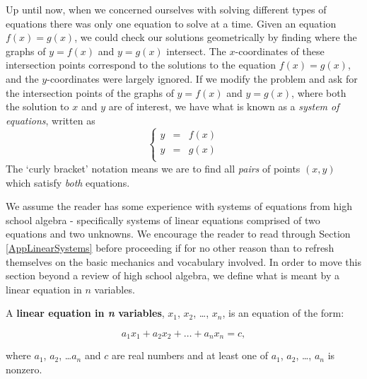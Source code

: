 \documentclass{ximera}
\begin{document}
	\author{Stitz-Zeager}




\setcounter{footnote}{0}

\label{LinSystems}

\setlength{\extrarowheight}{0pt}

Up until now, when we concerned ourselves with solving different types of equations there was only one equation to solve at a time.  Given an equation $f(x) = g(x)$, we could check our solutions geometrically by finding where the graphs of $y=f(x)$ and $y=g(x)$ intersect. The $x$-coordinates of these intersection points correspond to the solutions to the equation $f(x) = g(x)$, and the $y$-coordinates were largely ignored.  If we modify the problem and ask for the intersection points of the graphs of $y=f(x)$ and $y=g(x)$, where both the solution to $x$ and $y$ are of interest, we have what is known as a  \textit{system of equations},  written as \[ \left\{ \begin{array}{rcl} y & = & f(x) \\ y & = & g(x) \\ \end{array} \right.\]  The `curly bracket' notation means we are  to find all \textit{pairs} of points $(x,y)$ which satisfy \textit{both} equations.  

We assume the reader has some experience with systems of equations from high school algebra - specifically systems of linear equations comprised of two equations and two unknowns. We encourage the reader to read through Section \ref{AppLinearSystems} before proceeding if for no other reason than to refresh themselves on the basic mechanics and vocabulary involved.  In order to move this section beyond a review of high school algebra, we  define what is meant by a linear equation in $n$ variables.

 


\begin{definition}  \label{lineareqnnvariables}  A \textbf{linear equation in \textit{n} variables}, $x_1$, $x_2$, \ldots, $x_{n}$, is an equation of the form:

 \[a_1 x_1 + a_2 x_2 + \ldots + a_{n} x_{n} = c,\]
 
 
  where $a_1$, $a_2$, \dots $a_{n}$  and $c$ are real numbers and at least one of $a_1$, $a_2$, \dots, $a_{n}$ is nonzero.

\end{definition}
\end{document}
